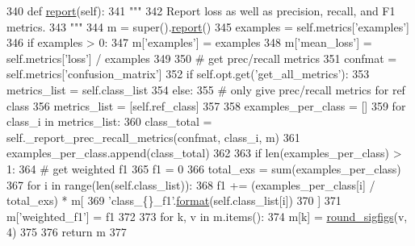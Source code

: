 \begin{DoxyCode}
340     \textcolor{keyword}{def }\hyperlink{namespaceprojects_1_1convai2_1_1eval__f1_a01a47b9c08dad189837a51f085defc45}{report}(self):
341         \textcolor{stringliteral}{"""}
342 \textcolor{stringliteral}{        Report loss as well as precision, recall, and F1 metrics.}
343 \textcolor{stringliteral}{        """}
344         m = super().\hyperlink{namespaceprojects_1_1convai2_1_1eval__f1_a01a47b9c08dad189837a51f085defc45}{report}()
345         examples = self.metrics[\textcolor{stringliteral}{'examples'}]
346         \textcolor{keywordflow}{if} examples > 0:
347             m[\textcolor{stringliteral}{'examples'}] = examples
348             m[\textcolor{stringliteral}{'mean\_loss'}] = self.metrics[\textcolor{stringliteral}{'loss'}] / examples
349 
350             \textcolor{comment}{# get prec/recall metrics}
351             confmat = self.metrics[\textcolor{stringliteral}{'confusion\_matrix'}]
352             \textcolor{keywordflow}{if} self.opt.get(\textcolor{stringliteral}{'get\_all\_metrics'}):
353                 metrics\_list = self.class\_list
354             \textcolor{keywordflow}{else}:
355                 \textcolor{comment}{# only give prec/recall metrics for ref class}
356                 metrics\_list = [self.ref\_class]
357 
358             examples\_per\_class = []
359             \textcolor{keywordflow}{for} class\_i \textcolor{keywordflow}{in} metrics\_list:
360                 class\_total = self.\_report\_prec\_recall\_metrics(confmat, class\_i, m)
361                 examples\_per\_class.append(class\_total)
362 
363             \textcolor{keywordflow}{if} len(examples\_per\_class) > 1:
364                 \textcolor{comment}{# get weighted f1}
365                 f1 = 0
366                 total\_exs = sum(examples\_per\_class)
367                 \textcolor{keywordflow}{for} i \textcolor{keywordflow}{in} range(len(self.class\_list)):
368                     f1 += (examples\_per\_class[i] / total\_exs) * m[
369                         \textcolor{stringliteral}{'class\_\{\}\_f1'}.\hyperlink{namespaceparlai_1_1chat__service_1_1services_1_1messenger_1_1shared__utils_a32e2e2022b824fbaf80c747160b52a76}{format}(self.class\_list[i])
370                     ]
371                 m[\textcolor{stringliteral}{'weighted\_f1'}] = f1
372 
373         \textcolor{keywordflow}{for} k, v \textcolor{keywordflow}{in} m.items():
374             m[k] = \hyperlink{namespaceparlai_1_1agents_1_1legacy__agents_1_1seq2seq_1_1utils__v0_af377ec61bfc0423461e7b409ffc883b9}{round\_sigfigs}(v, 4)
375 
376         \textcolor{keywordflow}{return} m
377 
\end{DoxyCode}
\mbox{\label{classparlai_1_1core_1_1torch__classifier__agent_1_1TorchClassifierAgent_ac96e55ac13019eace0641a7efcf6dc44}} 
